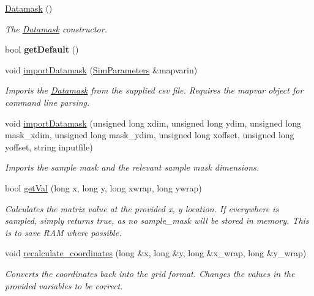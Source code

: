 \begin{DoxyCompactItemize}
\item 
\hyperlink{class_datamask_a15b4eff700fb628df58218873dd20923}{Datamask} ()\hypertarget{class_datamask_a15b4eff700fb628df58218873dd20923}{}\label{class_datamask_a15b4eff700fb628df58218873dd20923}

\begin{DoxyCompactList}\small\item\em The \hyperlink{class_datamask}{Datamask} constructor. \end{DoxyCompactList}\item 
bool {\bfseries get\+Default} ()\hypertarget{class_datamask_a1f5143c6e62658405ab3b6f3e7f72ca6}{}\label{class_datamask_a1f5143c6e62658405ab3b6f3e7f72ca6}

\item 
void \hyperlink{class_datamask_aad6a506b31b9b4769959162d0c4e7be9}{import\+Datamask} (\hyperlink{struct_sim_parameters}{Sim\+Parameters} \&mapvarin)
\begin{DoxyCompactList}\small\item\em Imports the \hyperlink{class_datamask}{Datamask} from the supplied csv file. Requires the mapvar object for command line parsing. \end{DoxyCompactList}\item 
void \hyperlink{class_datamask_a4cdab1f669b297f021930d73c464144c}{import\+Datamask} (unsigned long xdim, unsigned long ydim, unsigned long mask\+\_\+xdim, unsigned long mask\+\_\+ydim, unsigned long xoffset, unsigned long yoffset, string inputfile)
\begin{DoxyCompactList}\small\item\em Imports the sample mask and the relevant sample mask dimensions. \end{DoxyCompactList}\item 
bool \hyperlink{class_datamask_a4bff693738a40153bbad941454eb9a90}{get\+Val} (long x, long y, long xwrap, long ywrap)
\begin{DoxyCompactList}\small\item\em Calculates the matrix value at the provided x, y location. If everywhere is sampled, simply returns true, as no sample\+\_\+mask will be stored in memory. This is to save R\+AM where possible. \end{DoxyCompactList}\item 
void \hyperlink{class_datamask_ac3c22d32642effc1fcf8f44bf0842dfc}{recalculate\+\_\+coordinates} (long \&x, long \&y, long \&x\+\_\+wrap, long \&y\+\_\+wrap)
\begin{DoxyCompactList}\small\item\em Converts the coordinates back into the grid format. Changes the values in the provided variables to be correct. \end{DoxyCompactList}\end{DoxyCompactItemize}
